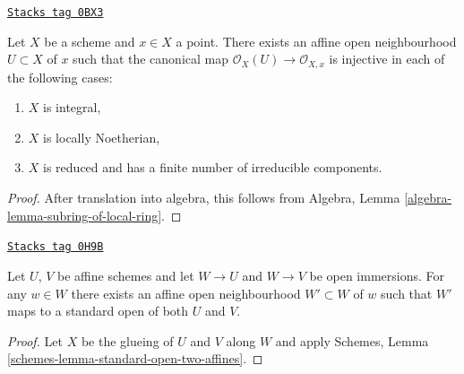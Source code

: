 \begin{lemma}
\label{properties-lemma-ring-affine-open-injective-local-ring}
\href{https://stacks.math.columbia.edu/tag/0BX3}{\texttt{Stacks tag 0BX3}}

Let $X$ be a scheme and $x \in X$ a point. There exists an affine open
neighbourhood $U \subset X$ of $x$ such that the canonical map
$\mathcal{O}_X(U) \to \mathcal{O}_{X, x}$ is injective in each of
the following cases:
\begin{enumerate}
\item $X$ is integral,
\item $X$ is locally Noetherian,
\item $X$ is reduced and has a finite number of irreducible components.
\end{enumerate}
\end{lemma}

\begin{proof}
After translation into algebra, this follows from
Algebra, Lemma \ref{algebra-lemma-subring-of-local-ring}.
\end{proof}

\begin{lemma}
\label{properties-lemma-standard-open-two-affines}
\href{https://stacks.math.columbia.edu/tag/0H9B}{\texttt{Stacks tag 0H9B}}

Let $U$, $V$ be affine schemes and let $W \to U$ and $W \to V$
be open immersions. For any $w \in W$ there exists an affine
open neighbourhood $W' \subset W$ of $w$ such that $W'$
maps to a standard open of both $U$ and $V$.
\end{lemma}

\begin{proof}
Let $X$ be the glueing of $U$ and $V$ along $W$ and
apply Schemes, Lemma \ref{schemes-lemma-standard-open-two-affines}.
\end{proof}



